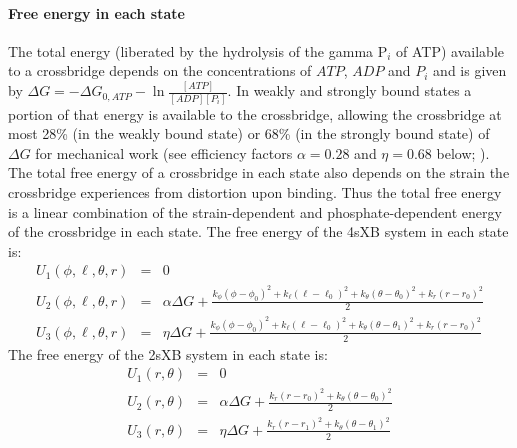 \documentclass[]{article}
\begin{document}
\paragraph{Free energy in each state} %
The total energy (liberated by the hydrolysis of the gamma P$_i$ of ATP) available to a crossbridge depends on the concentrations of $ATP$, $ADP$ and $P_i$ and is given by $\Delta G = -\Delta G_{0,ATP} - \ln \frac{[ATP]}{[ADP] [P_i]}$. 
In weakly and strongly bound states a portion of that energy is available to the crossbridge, allowing the crossbridge at most 28\% (in the weakly bound state) or 68\% (in the strongly bound state) of $\Delta G$ for mechanical work (see efficiency factors $\alpha=0.28$ and $\eta=0.68$ below; \citet{Pate1989, Tanner2007}).
The total free energy of a crossbridge in each state also depends on the strain the crossbridge experiences from distortion upon binding.
Thus the total free energy is a linear combination of the strain-dependent and phosphate-dependent energy of the crossbridge in each state.
The free energy of the 4sXB system in each state is: 
\begin{eqnarray}
\label{4sEnergy}
U_1(\phi,\ell,\theta,r) & = & 0 \nonumber \\
U_2(\phi,\ell,\theta,r) & = & \alpha \Delta G + \frac{k_\phi (\phi-\phi_0)^2 + k_\ell (\ell-\ell_0)^2 + k_\theta (\theta-\theta_0)^2 + k_r (r-r_0)^2}{2} \nonumber \\
U_3(\phi,\ell,\theta,r) & = & \eta \Delta G + \frac{k_\phi (\phi-\phi_0)^2 + k_\ell (\ell-\ell_0)^2 + k_\theta (\theta-\theta_1)^2 + k_r (r-r_0)^2}{2} \nonumber
\end{eqnarray}
The free energy of the 2sXB system in each state is: 
\begin{eqnarray}
\label{2sEnergy}
	U_1(r,\theta) & = & 0 \nonumber \\
    U_2(r,\theta) & = & \alpha \Delta G + \frac{k_r (r - r_0)^2 + 
                        k_\theta (\theta - \theta_0)^2}{2} \nonumber \\
    U_3(r,\theta) & = & \eta \Delta G   + \frac{k_r (r - r_1)^2 + 
                        k_\theta (\theta - \theta_1)^2}{2} \nonumber
\end{eqnarray}
\end{document}
